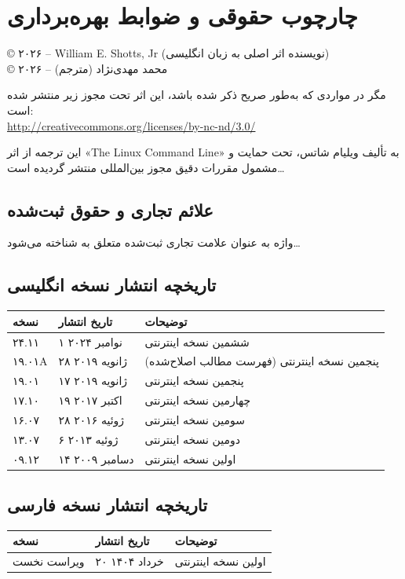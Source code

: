 \chapter*{چارچوب حقوقی و ضوابط بهره‌برداری}

© ۲۰۲۶ – William E. Shotts, Jr (نویسنده اثر اصلی به زبان انگلیسی)\\
© ۲۰۲۶ – محمد مهدی‌نژاد (مترجم)

\vspace{0.6em}
مگر در مواردی که به‌طور صریح ذکر شده باشد، این اثر تحت مجوز زیر منتشر شده است:\\
\url{http://creativecommons.org/licenses/by-nc-nd/3.0/}

\vspace{0.6em}
این ترجمه از اثر «The Linux Command Line» به تألیف ویلیام شاتس، تحت حمایت و مشمول مقررات دقیق مجوز بین‌المللی  منتشر گردیده است…

\section*{علائم تجاری و حقوق ثبت‌شده}
واژه  به عنوان علامت تجاری ثبت‌شده متعلق به  شناخته می‌شود…

\section*{تاریخچه انتشار نسخه انگلیسی}
\begin{table}[htbp]
\centering
\begin{tabular}{lll}
\toprule
\textbf{نسخه} & \textbf{تاریخ انتشار} & \textbf{توضیحات} \\
\midrule
۲۴.۱۱  & ۱ نوامبر ۲۰۲۴     & ششمین نسخه اینترنتی \\
۱۹.۰۱A & ۲۸ ژانویه ۲۰۱۹    & پنجمین نسخه اینترنتی (فهرست مطالب اصلاح‌شده) \\
۱۹.۰۱  & ۱۷ ژانویه ۲۰۱۹    & پنجمین نسخه اینترنتی \\
۱۷.۱۰  & ۱۹ اکتبر ۲۰۱۷     & چهارمین نسخه اینترنتی \\
۱۶.۰۷  & ۲۸ ژوئیه ۲۰۱۶     & سومین نسخه اینترنتی \\
۱۳.۰۷  & ۶ ژوئیه ۲۰۱۳      & دومین نسخه اینترنتی \\
۰۹.۱۲  & ۱۴ دسامبر ۲۰۰۹    & اولین نسخه اینترنتی \\
\bottomrule
\end{tabular}
\end{table}

\section*{تاریخچه انتشار نسخه فارسی}
\begin{table}[htbp]
\centering
\begin{tabular}{lll}
\toprule
\textbf{نسخه} & \textbf{تاریخ انتشار} & \textbf{توضیحات} \\
\midrule
ویراست نخست & ۲۰ خرداد ۱۴۰۴ & اولین نسخه اینترنتی \\
\bottomrule
\end{tabular}
\end{table}
